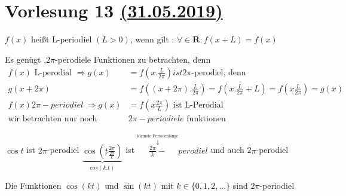\section{Vorlesung 13 \href{https://tu-dresden.de/mn/math/algebra/das-institut/beschaeftigte/antje-noack/ressourcen/dateien/v120-1/MathMethInf13.pdf?lang=en}{(31.05.2019)}}
\begin{definition}[L-periodial]
	$f(x)$ heißt L-periodiel $(L>0)$, wenn gilt : $\forall \in \mathbf{R}: f(x+L)=f(x)$
\end{definition}
\begin{remark}
	Es genügt ,$2\pi$-perodiele Funktionen zu betrachten, denn 
\begin{align*}
f(x) \text{ L-perodial }\Rightarrow  g(x)&= f(x.\frac{L}{2\pi}) ist 2\pi\text{-perodiel, denn }\\
								g(x+2\pi)&= f((x+2\pi).\frac{L}{2\pi})= f(x.\frac{L}{2\pi}+L)=f(x\frac{L}{2\pi})=g(x)\\
f(x)  2\pi-periodiel \ \Rightarrow g(x)&= f(x\frac{2\pi}{L})\text{ ist L-Perodial}\\
\text{wir betrachten nur noch }& 2\pi-periodiele\text{ funktionen}
\end{align*}
\end{remark}
\begin{example}
	$\cos t$ ist $2\pi$-perodiel  
	$\underbrace{\cos(t\frac{2\pi}{\frac{2\pi}{k}})}_{cos(k.t)}$ ist 
	$\overset{\overset{\text{kleinste Periodenlänge}}{\downarrow}}{\frac{2\pi}{k}-}perodiel$ und auch 2$\pi$-perodiel\\
\end{example}
\begin{remark}
Die Funktionen $\cos(kt)$ und $\sin(kt)$ mit $k\in \{ 0,1,2,... \}   $ sind $2\pi$-periodiel\\ 
\end{remark}
